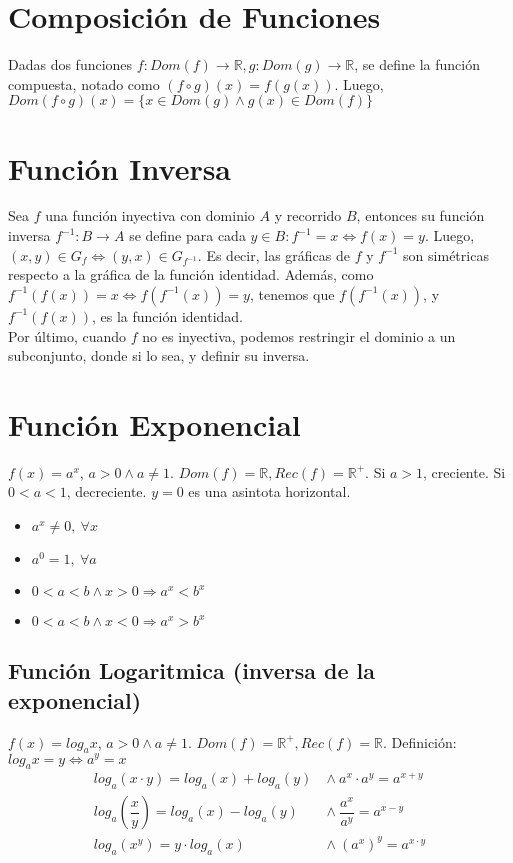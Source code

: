 \documentclass[11pt,a4paper]{article}
\begin{document}
\section{Composici\'on de Funciones}
\noindent Dadas dos funciones $f:Dom(f)\rightarrow\mathbb{R},g:Dom(g)\rightarrow\mathbb{R}$, se define la funci\'on compuesta, notado como $(f \circ g)(x) = f(g(x))$. Luego, $Dom(f\circ g)(x) = \{ x \in Dom(g) \land g(x) \in Dom(f) \} $

\section{Funci\'on Inversa}
\noindent Sea $f$ una funci\'on inyectiva con dominio $A$ y recorrido $B$, entonces su funci\'on inversa $f^{-1} : B \rightarrow A$ se define para cada $y \in B: f^{-1} = x \iff f(x) = y$. Luego, $(x,y) \in G_f \iff (y,x) \in G_{f^{-1}}$. Es decir, las gr\'aficas de $f$ y $f^{-1}$ son sim\'etricas respecto a la gr\'afica de la funci\'on identidad. Adem\'as, como $f^{-1}(f(x)) = x \iff f(f^{-1}(x)) = y$, tenemos que $f(f^{-1}(x))$, y $f^{-1}(f(x))$, es la funci\'on identidad. \\

\noindent Por \'ultimo, cuando $f$ no es inyectiva, podemos restringir el dominio a un subconjunto, donde si lo sea, y definir su inversa.

\section{Funci\'on Exponencial}
\noindent $f(x) = a^x$, $a>0 \land a \not = 1$. $Dom(f) = \mathbb{R}, Rec(f) = \mathbb{R}^+$. Si $a>1$, creciente. Si $0<a<1$, decreciente. $y=0$ es una asintota horizontal.
\begin{itemize}
\item $a^x \not = 0,\ \forall x$
\item $a^0 = 1,\ \forall a$
\item $0 < a < b \land x > 0 \Rightarrow a^x < b^x$
\item $0 < a < b \land x < 0 \Rightarrow a^x > b^x$
\end{itemize}
\subsection{Funci\'on Logaritmica (inversa de la exponencial)}
\noindent $f(x) = log_ax$, $a>0 \land a \not = 1$. $Dom(f) = \mathbb{R}^+, Rec(f) = \mathbb{R}$. Definici\'on: $log_ax = y \iff a^y = x$
\begin{align*}
log_a(x\cdot y) = log_a(x) + log_a(y)\ &\land\ a^x \cdot a^y = a^{x+y}\\
log_a\left(\dfrac{x}{y}\right) = log_a(x) - log_a(y)\ &\land\ \dfrac{a^x}{a^y} = a^{x-y}\\
log_a(x^y) = y \cdot log_a(x)\ &\land\ (a^x)^y = a^{x\cdot y}\\
\end{align*}
\end{document}
